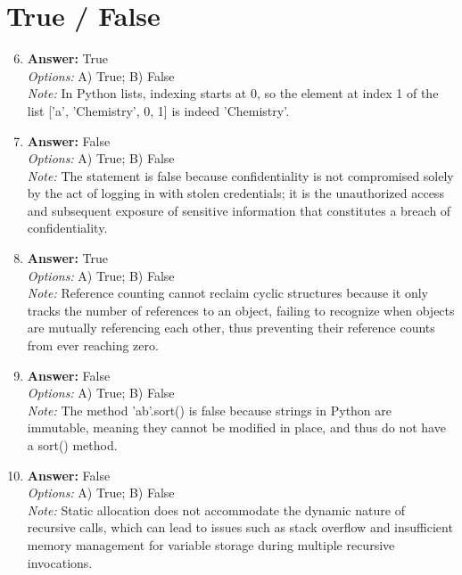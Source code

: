 \documentclass[12pt]{article}
\begin{document}
\section*{True / False}
\begin{enumerate}[label=\arabic*.]
\setcounter{enumi}{5}
\item \textbf{Answer:} True
\\ \textit{Options:} A) True; B) False
\\ \textit{Note:} In Python lists, indexing starts at 0, so the element at index 1 of the list ['a', 'Chemistry', 0, 1] is indeed 'Chemistry'.
\item \textbf{Answer:} False
\\ \textit{Options:} A) True; B) False
\\ \textit{Note:} The statement is false because confidentiality is not compromised solely by the act of logging in with stolen credentials; it is the unauthorized access and subsequent exposure of sensitive information that constitutes a breach of confidentiality.
\item \textbf{Answer:} True
\\ \textit{Options:} A) True; B) False
\\ \textit{Note:} Reference counting cannot reclaim cyclic structures because it only tracks the number of references to an object, failing to recognize when objects are mutually referencing each other, thus preventing their reference counts from ever reaching zero.
\item \textbf{Answer:} False
\\ \textit{Options:} A) True; B) False
\\ \textit{Note:} The method 'ab'.sort() is false because strings in Python are immutable, meaning they cannot be modified in place, and thus do not have a sort() method.
\item \textbf{Answer:} False
\\ \textit{Options:} A) True; B) False
\\ \textit{Note:} Static allocation does not accommodate the dynamic nature of recursive calls, which can lead to issues such as stack overflow and insufficient memory management for variable storage during multiple recursive invocations.
\end{enumerate}
\end{document}
